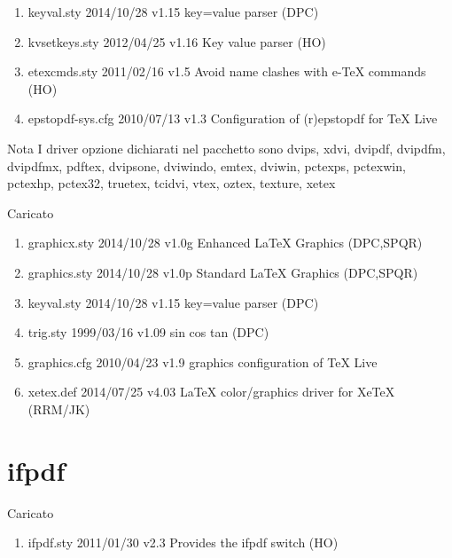 \begin{enumerate}
\item keyval.sty 2014/10/28 v1.15 key=value parser (DPC)
\item kvsetkeys.sty 2012/04/25 v1.16 Key value parser (HO)
\item etexcmds.sty 2011/02/16 v1.5 Avoid name clashes with e-TeX commands (HO)
\item epstopdf-sys.cfg 2010/07/13 v1.3 Configuration of (r)epstopdf for TeX Live 
\end{enumerate} 
Nota I driver opzione dichiarati nel pacchetto sono dvips, xdvi, dvipdf, dvipdfm, dvipdfmx, pdftex, dvipsone, dviwindo, emtex, dviwin, pctexps, pctexwin, pctexhp, pctex32, truetex, tcidvi, vtex, oztex, texture, xetex

Caricato 
\begin{enumerate}
 \item graphicx.sty 2014/10/28 v1.0g Enhanced LaTeX Graphics (DPC,SPQR)
 \item graphics.sty 2014/10/28 v1.0p Standard LaTeX Graphics (DPC,SPQR)
 \item keyval.sty 2014/10/28 v1.15 key=value parser (DPC)
 \item trig.sty 1999/03/16 v1.09 sin cos tan (DPC)
 \item graphics.cfg 2010/04/23 v1.9 graphics configuration of TeX Live
\item xetex.def 2014/07/25 v4.03 LaTeX color/graphics driver for XeTeX (RRM/JK)
\end{enumerate} 
\section{ifpdf}  

Caricato 
\begin{enumerate}
\item ifpdf.sty 2011/01/30 v2.3 Provides the ifpdf switch (HO)
\end{enumerate} 
